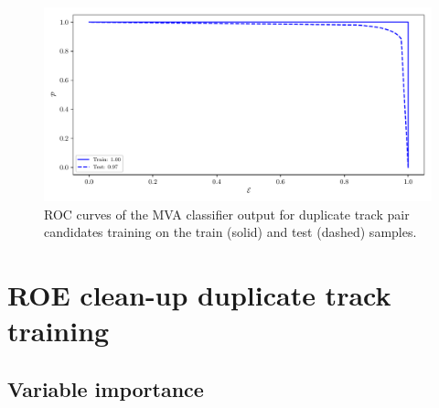 \begin{figure}[H]
\centering
\captionsetup{width=0.8\linewidth}
\includegraphics[width=\linewidth]{fig/addendums/dup_roc}
\caption{ROC curves of the MVA classifier output for duplicate track pair candidates training on the train (solid) and test (dashed) samples.}
\end{figure}

\section*{ROE clean-up duplicate track training}\label{sec:ROE_curl}

\subsection*{Variable importance}

